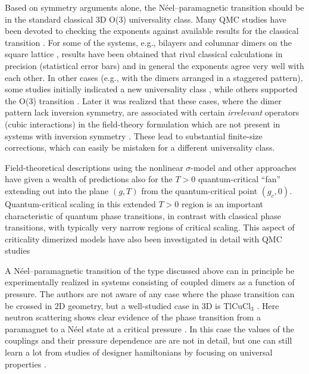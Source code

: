 \documentclass[range]{ar2e}
\begin{document}
Based on symmetry arguments alone, the N\'eel--paramagnetic transition should be in the standard classical 3D O($3$) universality class. Many QMC studies 
have been devoted to checking the exponents against available results for the classical transition \cite{Sandvik94,Troyer96,Matsumoto01,Wang06,Wenzel08,Wenzel09}.
For some of the systems, e.g., bilayers \cite{Wang06} and columnar dimers on the square lattice \cite{Matsumoto01,Wenzel09,Sandvik10b}, results have been 
obtained that rival classical calculations in precision (statistical error bars) and in general the exponents agree very well with each other. In other 
cases (e.g., with the dimers arranged in a staggered pattern), some studies initially indicated a new universality class \cite{Wenzel08}, while others
supported the O($3$) transition \cite{Jiang12}.  Later it was realized that these cases, where the dimer pattern lack inversion symmetry, are associated with certain
{\it irrelevant} operators (cubic interactions) in the field-theory formulation which are not present in systems with inversion symmetry \cite{Fritz11}. 
These lead to substantial finite-size corrections, which can easily be mistaken for a different universality class.

Field-theoretical descriptions using the nonlinear $\sigma$-model \cite{Haldane83,Chakravarty89,Chubukov94} and other approaches have given a wealth of 
predictions also for the $T>0$ quantum-critical ``fan'' extending out into the plane $(g,T)$  from the quantum-critical point $(g_c,0)$. Quantum-critical
scaling in this extended $T>0$ region is an important characteristic of quantum phase transitions, in contrast with classical phase transitions, with typically 
very narrow regions of critical scaling. This aspect of criticality dimerized models have also been investigated in detail with QMC studies \cite{Sandvik95,Brenig06,Sandvik11a}

A N\'eel--paramagnetic transition of the type discussed above can in principle be experimentally realized in systems consisting of coupled dimers as a function 
of pressure. The authors are not aware of any case where the phase transition can be crossed in 2D geometry, but a well-studied case in 3D is TlCuCl$_3$ 
\cite{Cavadini01,Ruegg04}. Here neutron scattering shows clear evidence of the phase transition from a paramagnet to a N\'eel state at a critical pressure 
\cite{Ruegg08}. In this case the values of the couplings and their pressure dependence are are not in detail, but one can still learn a lot from studies 
of designer hamiltonians by focusing on universal properties \cite{Troyer97,Jin12,Oitmaa11}.
\end{document}
